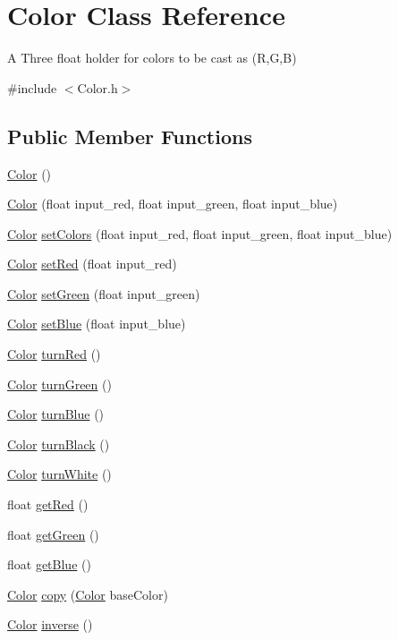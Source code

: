 \hypertarget{classColor}{\section{Color Class Reference}
\label{classColor}
}


A Three float holder for colors to be cast as (R,G,B)  




{\ttfamily \#include $<$Color.\-h$>$}

\subsection*{Public Member Functions}
\begin{DoxyCompactItemize}
\item 
\hyperlink{classColor_a9a742cbe9f9f4037f5d9f4e81a9b2428}{Color} ()
\item 
\hyperlink{classColor_af07af8fc1b1002d1d2db8f3d54ba28e9}{Color} (float input\-\_\-red, float input\-\_\-green, float input\-\_\-blue)
\item 
\hyperlink{classColor}{Color} \hyperlink{classColor_a268ca441e6c1780c77f5769d0713aede}{set\-Colors} (float input\-\_\-red, float input\-\_\-green, float input\-\_\-blue)
\item 
\hyperlink{classColor}{Color} \hyperlink{classColor_aacd0b5d30356e51a1b57151cbe49fd57}{set\-Red} (float input\-\_\-red)
\item 
\hyperlink{classColor}{Color} \hyperlink{classColor_a1892a99de7cca54543b4dc954413f7f6}{set\-Green} (float input\-\_\-green)
\item 
\hyperlink{classColor}{Color} \hyperlink{classColor_aa7fee41dde5551c88c68f91a7d5d15cb}{set\-Blue} (float input\-\_\-blue)
\item 
\hyperlink{classColor}{Color} \hyperlink{classColor_a2c287302d9a5f07a1dfd6b40f9ff10a4}{turn\-Red} ()
\item 
\hyperlink{classColor}{Color} \hyperlink{classColor_a2087acc41f2e0a62b907a91c31fe4d2d}{turn\-Green} ()
\item 
\hyperlink{classColor}{Color} \hyperlink{classColor_a27dedddac29c7915f3f2c1c262e903e3}{turn\-Blue} ()
\item 
\hyperlink{classColor}{Color} \hyperlink{classColor_a85f91c5e08f43ef23de5d757b9c39b80}{turn\-Black} ()
\item 
\hyperlink{classColor}{Color} \hyperlink{classColor_a5ba8f07e54bba3a0955be4f5eafc8318}{turn\-White} ()
\item 
float \hyperlink{classColor_a24d3bb135f529737210a158b9314798e}{get\-Red} ()
\item 
float \hyperlink{classColor_ab36ffa09d7fe233397656a673e7243c7}{get\-Green} ()
\item 
float \hyperlink{classColor_af80afc94fc75e299b6bf169339b8b67b}{get\-Blue} ()
\item 
\hyperlink{classColor}{Color} \hyperlink{classColor_a13ba5d6a45983aa63b45796191b96452}{copy} (\hyperlink{classColor}{Color} base\-Color)
\item 
\hyperlink{classColor}{Color} \hyperlink{classColor_a5cf7ac372245ebd651c54093fd69679d}{inverse} ()
\end{DoxyCompactItemize}
